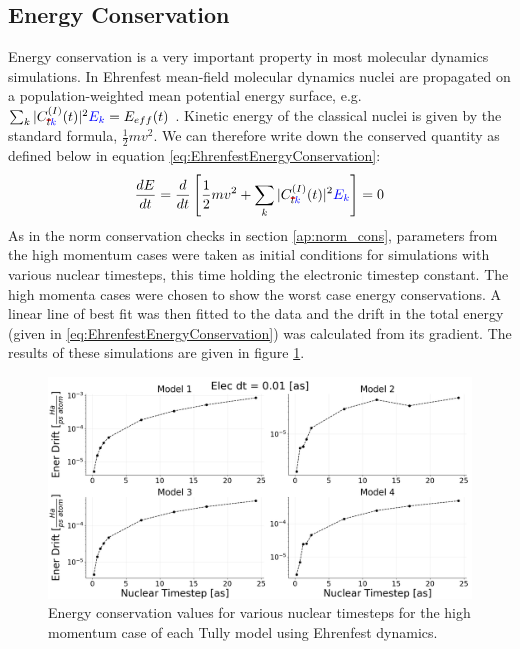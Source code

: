 \subsection{Energy Conservation}
Energy conservation is a very important property in most molecular dynamics simulations. In Ehrenfest  mean-field molecular dynamics nuclei are propagated on a population-weighted mean potential energy surface, e.g. $\sum_{k}|C_{\mremove{l}\madd{k}}^{(I)}(t)|^2 \madd{E_{k}} = E_{eff}(t)$ \cite{EhrenEnerCons}. Kinetic energy of the classical nuclei is given by the standard formula,  $\frac{1}{2} m v^2$. We can therefore write down the conserved quantity as defined below in equation \eqref{eq:EhrenfestEnergyConservation}:
\begin{equation}
	\frac{d E}{dt} = \frac{d}{dt} \left[ \frac{1}{2} m v^2 + \sum_{k}|C_{\mremove{l}\madd{k}}^{(I)}(t)|^2 \madd{E_{k}}\right] = 0
  \label{eq:EhrenfestEnergyConservation}
\end{equation}
As in the norm conservation checks in section \ref{ap:norm_cons},  parameters from the high momentum cases were taken as initial conditions for simulations with various nuclear timesteps, this time holding the electronic timestep constant. The high momenta cases were chosen to show the worst case energy conservations. A linear line of best fit was then fitted to the data and the drift in the total energy (given in \eqref{eq:EhrenfestEnergyConservation}) was calculated from its gradient. The results of these simulations are given in figure \ref{fig:EhrenEnerCons}.
\begin{figure}[ht]
  \includegraphics[width=\textwidth]{../img/CTMQC/TullyModels/Ehren_EnerCons.png}
  \caption{\label{fig:EhrenEnerCons}Energy conservation values for various nuclear timesteps for the high momentum case of each Tully model using Ehrenfest dynamics.}
\end{figure}
